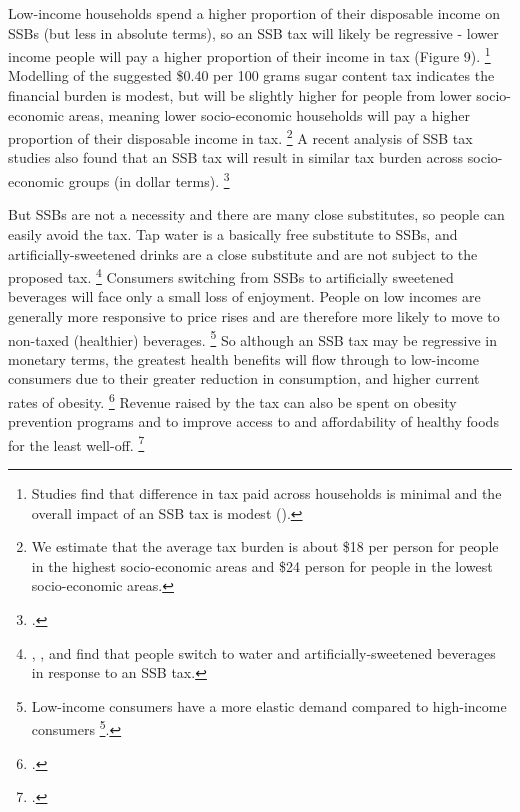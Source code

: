 \documentclass[embargoed]{grattan}
\begin{document}
Low-income households spend a higher proportion of their disposable income on SSBs (but less in absolute terms), so an SSB tax will likely be regressive - lower income people will pay a higher proportion of their income in tax (Figure 9).%
\footnote{Studies find that difference in tax paid across households is minimal and the overall impact of an SSB tax is modest (\textcites{Backholer2014effectsugarsweetened}{Etile2015DoHighConsumers}).} Modelling of the suggested \$0.40 per 100 grams sugar content tax indicates the financial burden is modest, but will be slightly higher for people from lower socio-economic areas, meaning lower socio-economic households will pay a higher proportion of their disposable income in tax.%
\footnote{We estimate that the average tax burden is about \$18 per person for people in the highest socio-economic areas and \$24 person for people in the lowest socio-economic areas.} A recent analysis of SSB tax studies also found that an SSB tax will result in similar tax burden across socio-economic groups (in dollar terms).%
\footcite{Backholer2016impacttaxsugar}

But SSBs are not a necessity and there are many close substitutes, so people can easily avoid the tax.
Tap water is a basically free substitute to SSBs, and artificially-sweetened drinks are a close substitute and are not subject to the proposed tax.%
\footnote{\textcite{Briggs2013Overallincomespecific}, \textcite{Colchero2016Beveragepurchasesstores}, \textcite{Sharma2014effectstaxingsugarsweetened} and \textcite{Zhen2014Predictingeffectssugar} find that people switch to water and artificially-sweetened beverages in response to an SSB tax.}
Consumers switching from SSBs to artificially sweetened beverages will face only a small loss of enjoyment.
People on low incomes are generally more responsive to price rises and are therefore more likely to move to non-taxed (healthier) beverages.%
\footnote{Low-income consumers have a more elastic demand compared to high-income consumers \footcites{Yang2016child}{Colchero2016Beveragepurchasesstores}{Etile2015DoHighConsumers}{Briggs2013Overallincomespecific}.} So although an SSB tax may be regressive in monetary terms, the greatest health benefits will flow through to low-income consumers due to their greater reduction in consumption, and higher current rates of obesity.%
\footcites{Coalition2016Policybriefcase}{Organization2016FiscalPoliciesDiet}{Backholer2016impacttaxsugar} Revenue raised by the tax can also be spent on obesity prevention programs and to improve access to and affordability of healthy foods for the least well-off.%
\footcites{Wetter2016TaxingSugarSweetened}{Organization2016FiscalPoliciesDiet}
\end{document}
